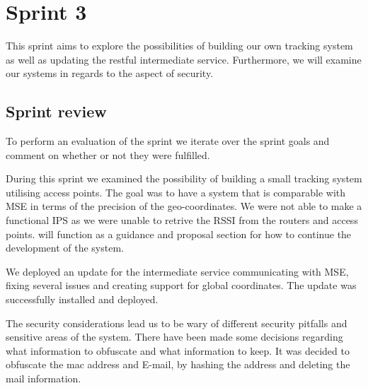 \chapter{Sprint 3}\label{cha:sprint3}
This sprint aims to explore the possibilities of building our own tracking system as well as updating the restful intermediate service. Furthermore, we will examine our systems in regards to the aspect of security.




\section{Sprint review}
To perform an evaluation of the sprint we iterate over the sprint goals and comment on whether or not they were fulfilled.

During this sprint we examined the possibility of building a small tracking system utilising access points. The goal was to have a system that is comparable with MSE in terms of the precision of the geo-coordinates. We were not able to make a functional IPS as we were unable to retrive the RSSI from the routers and access points.  will function as a guidance and proposal section for how to continue the development of the system.

We deployed an update for the intermediate service communicating with MSE, fixing several issues and creating support for global coordinates. The update was successfully installed and deployed.

The security considerations lead us to be wary of different security pitfalls and sensitive areas of the system. There have been made some decisions regarding what information to obfuscate and what information to keep. It was decided to obfuscate the mac address and E-mail, by hashing the address and deleting the mail information.